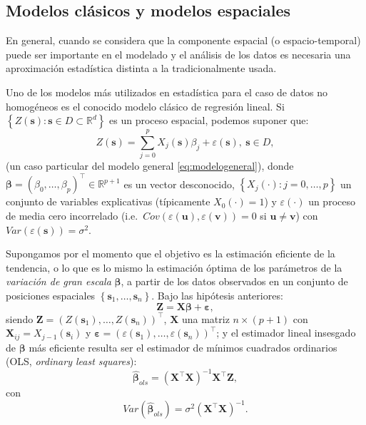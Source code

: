 \documentclass[
]{book}
\theoremstyle{break}
\theoremstyle{definition}
\theoremstyle{definition}
\theoremstyle{definition}
\theoremstyle{definition}
\theoremstyle{remark}
\begin{document}
\subsection{Modelos clásicos y modelos espaciales}\label{modelos-clasicos-espaciales}

En general, cuando se considera que la componente espacial (o espacio-temporal) puede ser importante en el modelado y el análisis de los datos es necesaria una aproximación estadística distinta a la tradicionalmente usada.

Uno de los modelos más utilizados en estadística para el caso de datos no homogéneos es el conocido modelo clásico de regresión lineal.
Si \(\left\{ Z(\mathbf{s}):\mathbf{s}\in D\subset \mathbb{R}^{d} \right\}\) es un proceso espacial, podemos suponer que:
\begin{equation}
  Z(\mathbf{s})=\sum\limits_{j=0}^{p}X_{j}(\mathbf{s})\beta_{j} +\varepsilon(\mathbf{s}),\ \mathbf{s}\in D,
  \label{eq:modelolineal}
\end{equation}
(un caso particular del modelo general \eqref{eq:modelogeneral}), donde \(\boldsymbol{\beta }=(\beta_{0}, \ldots,\beta_{p})^{\top}\in \mathbb{R}^{p+1}\) es un vector desconocido, \(\left\{ X_{j} (\cdot):j=0, \ldots,p\right\}\) un conjunto de variables explicativas (típicamente \(X_0(\cdot)=1\)) y \(\varepsilon(\cdot)\) un proceso de media cero incorrelado (i.e.~\(Cov(\varepsilon (\mathbf{u}),\varepsilon (\mathbf{v}))=0\) si \(\mathbf{u}\neq \mathbf{v}\)) con \(Var(\varepsilon (\mathbf{s}))=\sigma^{2}\).

Supongamos por el momento que el objetivo es la estimación eficiente de la tendencia, o lo que es lo mismo la estimación óptima de los parámetros de la \emph{variación de gran escala} \(\boldsymbol{\beta}\), a partir de los datos observados en un conjunto de posiciones espaciales \(\left\{ \mathbf{s}_{1}, \ldots,\mathbf{s}_{n} \right\}\).
Bajo las hipótesis anteriores:
\[\mathbf{Z} = \mathbf{X}\boldsymbol{\beta} + \boldsymbol{\varepsilon},\]
siendo \(\mathbf{Z}=\left( Z(\mathbf{s}_{1}), \ldots,Z(\mathbf{s}_{n}) \right)^{\top}\), \(\mathbf{X}\) una matriz \(n\times (p+1)\) con \(\mathbf{X}_{ij}=X_{j-1}(\mathbf{s}_{i})\) y \(\boldsymbol{\varepsilon} = \left( \varepsilon (\mathbf{s}_{1}), \ldots,\varepsilon (\mathbf{s}_{n})\right)^{\top}\); y el estimador lineal insesgado de \(\boldsymbol{\beta}\) más eficiente resulta ser el estimador de mínimos cuadrados ordinarios (OLS, \emph{ordinary least squares}):
\begin{equation} 
  \hat{\boldsymbol{\beta}}_{ols}=(\mathbf{X}^{\top}\mathbf{X})^{-1}\mathbf{X}^{\top}\mathbf{Z},
  \label{eq:beta-ols}
\end{equation}
con \[Var(\hat{\boldsymbol{\beta}}_{ols})=\sigma^{2}(\mathbf{X}^{\top}\mathbf{X})^{-1}.\]
\end{document}
